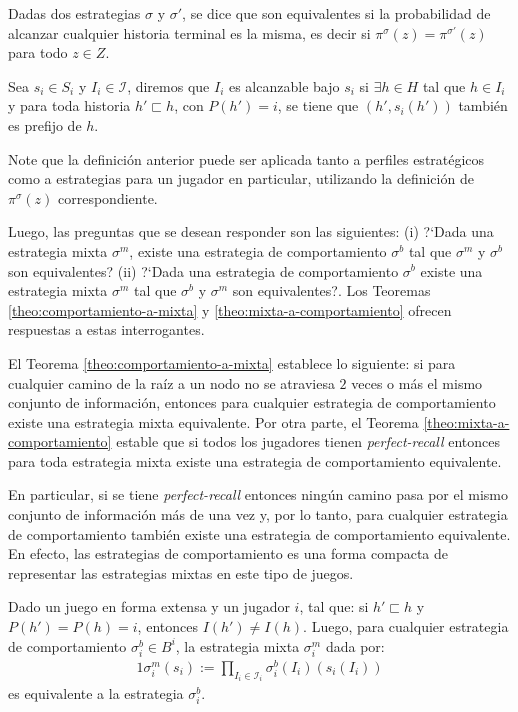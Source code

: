 \begin{definition}
\label{def:equivalencia-estrategias}
Dadas dos estrategias $\sigma$ y $\sigma'$, se dice que son equivalentes si la probabilidad de alcanzar cualquier historia terminal es la misma, es decir si $\pi^\sigma(z) = \pi^{\sigma'}(z)$ para todo $z \in Z$.
\end{definition}

\begin{definition}
\label{def:alcanzabilidad-historia}
Sea $s_i \in S_i$ y $I_i \in \mathcal{I}$, diremos que $I_i$ es alcanzable bajo $s_i$ si $\exists h \in H$ tal que $h \in I_i$ y para toda historia $h' \sqsubset h$, con $P(h') = i$, se tiene que $(h', s_i(h'))$ también es prefijo de $h$.  
\end{definition}

Note que la definición anterior puede ser aplicada tanto a perfiles estratégicos como a estrategias para un jugador en particular, utilizando la definición de $\pi^{\sigma}(z)$ correspondiente.

Luego, las preguntas que se desean responder son las siguientes: (i) ?`Dada una estrategia mixta $\sigma^m$, existe una estrategia de comportamiento $\sigma^b$ tal que $\sigma^m$ y $\sigma^b$ son equivalentes? (ii) ?`Dada una estrategia de comportamiento $\sigma^b$ existe una estrategia mixta $\sigma^m$ tal que $\sigma^b$ y $\sigma^m$ son equivalentes?. Los Teoremas \ref{theo:comportamiento-a-mixta} y \ref{theo:mixta-a-comportamiento} ofrecen respuestas a estas interrogantes.

El Teorema \ref{theo:comportamiento-a-mixta} establece lo siguiente: si para cualquier camino de la raíz a un nodo no se atraviesa $2$ veces o más el mismo conjunto de información, entonces para cualquier estrategia de comportamiento existe una estrategia mixta equivalente. Por otra parte, el Teorema \ref{theo:mixta-a-comportamiento} estable que si todos los jugadores tienen \textit{perfect-recall} entonces para toda estrategia mixta existe una estrategia de comportamiento equivalente.

En particular, si se tiene \textit{perfect-recall} entonces ningún camino pasa por el mismo conjunto de información más de una vez y, por lo tanto, para cualquier estrategia de comportamiento también existe una estrategia de comportamiento equivalente. En efecto, las estrategias de comportamiento es una forma compacta de representar las estrategias mixtas en este tipo de juegos.

\begin{theorem}
\label{theo:comportamiento-a-mixta}
Dado un juego en forma extensa y un jugador $i$, tal que: si $h' \sqsubset h$ y $P(h') = P(h) = i$, entonces $I(h') \neq I(h)$. Luego, para cualquier estrategia de comportamiento $\sigma^b_i \in B^i$, la estrategia mixta $\sigma^m_i$ dada por:
\begin{alignat}{1}
\sigma^m_i(s_i) := \prod_{I_i \in \mathcal{I}_i} \sigma^b_i(I_i)(s_i(I_i)) \label{eq:comportamiento-a-mixta}
\end{alignat}
es equivalente a la estrategia $\sigma^b_i$.
\end{theorem}

